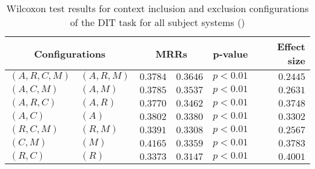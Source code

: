 
\begin{table}
\begin{spacing}{1.2}
\centering
\caption{Wilcoxon test results for context inclusion and exclusion configurations of the DIT task for all subject systems (\ctwo)}
\label{table:versus-wilcox-all-dit-context}
\begin{tabular}{ll|rr|rr}
\toprule
      \multicolumn{2}{c|}{Configurations} &                \multicolumn{2}{c|}{MRRs} &        p-value & Effect size \\
\midrule
 $(A,R,C,M)$ &  $(A,R,M)$ &  $\bm{0.3784}$ &  $0.3646$ & $p<0.01$ &    $0.2445$ \\
   $(A,C,M)$ &    $(A,M)$ &  $\bm{0.3785}$ &  $0.3537$ & $p<0.01$ &    $0.2631$ \\
   $(A,R,C)$ &    $(A,R)$ &  $\bm{0.3770}$ &  $0.3462$ & $p<0.01$ &    $0.3748$ \\
     $(A,C)$ &      $(A)$ &  $\bm{0.3802}$ &  $0.3380$ & $p<0.01$ &    $0.3302$ \\
   $(R,C,M)$ &    $(R,M)$ &  $\bm{0.3391}$ &  $0.3308$ & $p<0.01$ &    $0.2567$ \\
     $(C,M)$ &      $(M)$ &  $\bm{0.4165}$ &  $0.3359$ & $p<0.01$ &    $0.3783$ \\
     $(R,C)$ &      $(R)$ &  $\bm{0.3373}$ &  $0.3147$ & $p<0.01$ &    $0.4001$ \\
\bottomrule
\end{tabular}

\end{spacing}
\end{table}

